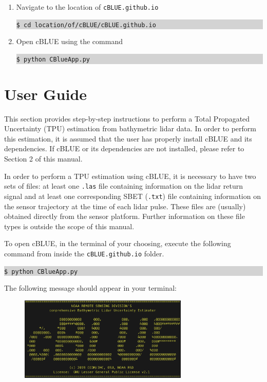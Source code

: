 \documentclass[11pt, a4paper]{article}
\begin{document}
\begin{enumerate}
\begin{figure}[H]
    \end{figure}
    \vspace{1em}
    \item Navigate to the location of \texttt{cBLUE.github.io}
    \colorbox{lightgray}{\begin{minipage}{\linewidth}
          \texttt{\$ cd location/of/cBLUE/cBLUE.github.io}
    \end{minipage}}
    \vspace{1em}
    \item Open cBLUE using the command
    \colorbox{lightgray}{\begin{minipage}{\linewidth}
        \texttt{\$ python CBlueApp.py}
    \end{minipage}}
\end{enumerate}

\section{User Guide}
This section provides step-by-step instructions to perform a Total Propagated Uncertainty (TPU) estimation from bathymetric lidar data. In order to perform this estimation, it is assumed that the user has properly install cBLUE and its dependencies. If cBLUE or its dependencies are not installed, please refer to Section 2 of this manual.

\vspace{1em}

In order to perform a TPU estimation using cBLUE, it is necessary to have two sets of files: at least one \texttt{.las} file containing information on the lidar return signal and at least one corresponding SBET (\texttt{.txt}) file containing information on the sensor trajectory at the time of each lidar pulse. These files are (usually) obtained directly from the sensor platform. Further information on these file types is outside the scope of this manual.

\vspace{1em}

To open cBLUE, in the terminal of your choosing, execute the following command from inside the \texttt{cBLUE.github.io} folder.
\colorbox{lightgray}{\begin{minipage}{\linewidth}
        \texttt{\$ python CBlueApp.py}
\end{minipage}}

\vspace{1em}

The following message should appear in your terminal:
\begin{figure}[H]
    \centering
    \includegraphics[height=4cm]{figs/cblue_term_logo.png}
\end{figure}
\end{document}
